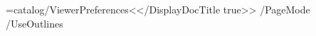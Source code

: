 \everyjob=\expandafter{\the\everyjob\pdfextension catalog{/ViewerPreferences<</DisplayDocTitle true>> /PageMode /UseOutlines}}
